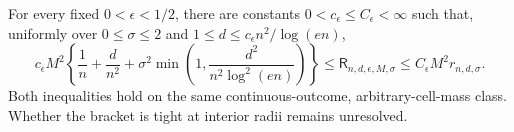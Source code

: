 For every fixed \(0<\epsilon<1/2\), there are constants \(0<c_{\epsilon}\le C_{\epsilon}<\infty\) such that, uniformly over \(0\le\sigma\le2\) and \(1\le d\le c_{\epsilon}n^2/\log(en)\),
\[
 c_{\epsilon}M^2\left\{\frac1n+\frac d{n^2}+\sigma^2\min\left(1,\frac{d^2}{n^2\log^2(en)}\right)\right\}
 \le\mathsf R_{n,d,\epsilon,M,\sigma}
 \le C_{\epsilon}M^2r_{n,d,\sigma}.
\]
Both inequalities hold on the same continuous-outcome, arbitrary-cell-mass class.  Whether the bracket is tight at interior radii remains unresolved.
